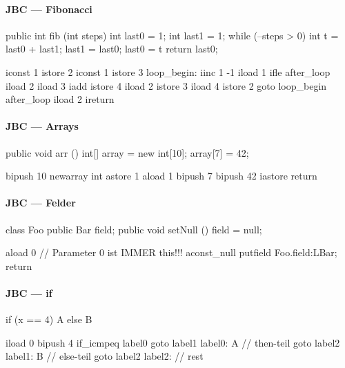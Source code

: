 \paragraph{JBC --- Fibonacci}
\begin{java}
  public int fib (int steps) {
    int last0 = 1;
    int last1 = 1;
    while (--steps > 0) {
      int t = last0 + last1;
      last1 = last0;
      last0 = t
    }
    return last0;
  }
\end{java}
\begin{java}
  iconst 1
  istore 2
  iconst 1
  istore 3
  loop_begin:
  iinc 1 -1
  iload 1
  ifle after_loop
  iload 2
  iload 3
  iadd
  istore 4
  iload 2
  istore 3
  iload 4
  istore 2
  goto loop_begin
  after_loop
  iload 2
  ireturn
\end{java}

\paragraph{JBC --- Arrays}
\begin{java}
  public void arr () {
    int[] array = new int[10];
    array[7] = 42;
  }
\end{java}
\begin{java}
  bipush 10
  newarray int
  astore 1
  aload 1
  bipush 7
  bipush 42
  iastore
  return
\end{java}

\paragraph{JBC --- Felder}
\begin{java}
  class Foo {
    public Bar field;
    public void setNull () {
      field = null;
    }
  }
\end{java}
\begin{java}
  aload 0 // Parameter 0 ist IMMER this!!!
  aconst_null
  putfield Foo.field:LBar;
  return
\end{java}

\paragraph{JBC --- if}
\begin{java}
  if (x == 4) { A } else { B }
\end{java}
\begin{java}
  iload 0
  bipush 4
  if_icmpeq label0
  goto label1
label0:
  A // then-teil
  goto label2
label1:
  B // else-teil
  goto label2
label2:
  // rest
\end{java}

